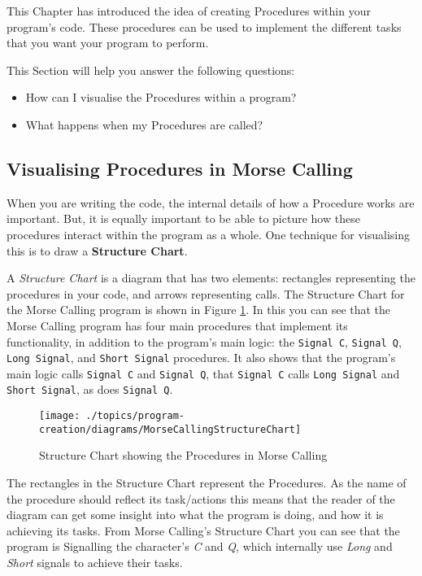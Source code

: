 This Chapter has introduced the idea of creating Procedures within your program's code. These procedures can be used to implement the different tasks that you want your program to perform. 

This Section will help you answer the following questions:
\begin{itemize}
  \item How can I visualise the Procedures within a program?
  \item What happens when my Procedures are called?
\end{itemize}

\subsection{Visualising Procedures in Morse Calling} %
\label{sub:visualising_morse_calling}

When you are writing the code, the internal details of how a Procedure works are important. But, it is equally important to be able to picture how these procedures interact within the program as a whole. One technique for visualising this is to draw a \textbf{Structure Chart}.

A \emph{Structure Chart} is a diagram that has two elements: rectangles representing the procedures in your code, and arrows representing calls. The Structure Chart for the Morse Calling program is shown in Figure \ref{fig:procedure-decl-morsecalling-structure}. In this you can see that the Morse Calling program has four main procedures that implement its functionality, in addition to the program's main logic: the \texttt{Signal C}, \texttt{Signal Q}, \texttt{Long Signal}, and \texttt{Short Signal} procedures. It also shows that the program's main logic calls \texttt{Signal C} and \texttt{Signal Q}, that \texttt{Signal C} calls \texttt{Long Signal} and \texttt{Short Signal}, as does \texttt{Signal Q}.

\begin{figure}[htbp]
   \centering
   \texttt{[image: ./topics/program-creation/diagrams/MorseCallingStructureChart]} 
   \caption{Structure Chart showing the Procedures in Morse Calling}
   \label{fig:procedure-decl-morsecalling-structure}
\end{figure}

The rectangles in the Structure Chart represent the Procedures. As the name of the procedure should reflect its task/actions this means that the reader of the diagram can get some insight into what the program is doing, and how it is achieving its tasks. From Morse Calling's Structure Chart you can see that the program is Signalling the character's \emph{C} and \emph{Q}, which internally use \emph{Long} and \emph{Short} signals to achieve their tasks.

